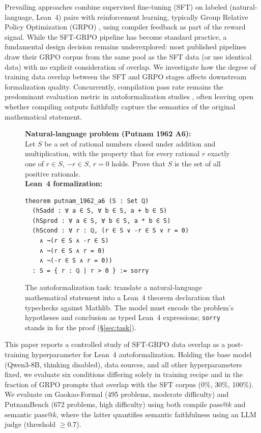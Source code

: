 \documentclass[11pt,a4paper]{article}
\begin{document}
Prevailing approaches combine supervised fine-tuning (SFT) on labeled (natural-language, Lean~4) pairs with reinforcement learning, typically Group Relative Policy Optimization (GRPO) \citep{shao2024deepseekmath}, using compiler feedback as part of the reward signal. While the SFT-GRPO pipeline has become standard practice, a fundamental design decision remains underexplored: most published pipelines draw their GRPO corpus from the same pool as the SFT data (or use identical data) with no explicit consideration of overlap. We investigate how the degree of training data overlap between the SFT and GRPO stages affects downstream formalization quality. Concurrently, compilation pass rate remains the predominant evaluation metric in autoformalization studies \citep{wang2025kimina, huang2025formalrl}, often leaving open whether compiling outputs faithfully capture the semantics of the original mathematical statement.

\begin{figure}[t]
\centering
\begin{mdframed}[backgroundcolor=codebg, linecolor=codeframe, linewidth=0.6pt, roundcorner=2pt]
{\small
\textbf{Natural-language problem (Putnam 1962 A6):}\\[2pt]
Let $S$ be a set of rational numbers closed under addition and multiplication, with the property that for every rational $r$ exactly one of $r \in S$, $-r \in S$, $r = 0$ holds. Prove that $S$ is the set of all positive rationals.\\[6pt]
\textbf{Lean~4 formalization:}
\begin{lstlisting}
theorem putnam_1962_a6 (S : Set ℚ)
  (hSadd : ∀ a ∈ S, ∀ b ∈ S, a + b ∈ S)
  (hSprod : ∀ a ∈ S, ∀ b ∈ S, a * b ∈ S)
  (hScond : ∀ r : ℚ, (r ∈ S ∨ -r ∈ S ∨ r = 0)
    ∧ ¬(r ∈ S ∧ -r ∈ S)
    ∧ ¬(r ∈ S ∧ r = 0)
    ∧ ¬(-r ∈ S ∧ r = 0))
  : S = { r : ℚ | r > 0 } := sorry
\end{lstlisting}
}
\end{mdframed}
\caption{The autoformalization task: translate a natural-language mathematical statement into a Lean~4 theorem declaration that typechecks against Mathlib. The model must encode the problem's hypotheses and conclusion as typed Lean~4 expressions; \texttt{sorry} stands in for the proof (\S\ref{sec:task}).}
\label{fig:task_example}
\end{figure}

This paper reports a controlled study of SFT-GRPO data overlap as a post-training hyperparameter for Lean~4 autoformalization. Holding the base model (Qwen3-8B, thinking disabled), data sources, and all other hyperparameters fixed, we evaluate six conditions differing solely in training recipe and in the fraction of GRPO prompts that overlap with the SFT corpus (0\%, 30\%, 100\%). We evaluate on Gaokao-Formal \citep{zhang2024gaokao} (495 problems, moderate difficulty) and PutnamBench \citep{tsoukalas2024putnambench} (672 problems, high difficulty) using both compile pass@$k$ and semantic pass@$k$, where the latter quantifies semantic faithfulness using an LLM judge (threshold $\geq 0.7$).
\end{document}
